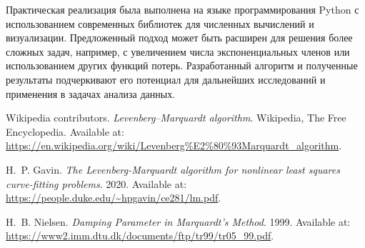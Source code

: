 Практическая реализация была выполнена на языке программирования Python с использованием современных библиотек для численных вычислений и визуализации. Предложенный подход может быть расширен для решения более сложных задач, например, с увеличением числа экспоненциальных членов или использованием других функций потерь. Разработанный алгоритм и полученные результаты подчеркивают его потенциал для дальнейших исследований и применения в задачах анализа данных.

\newpage

\begin{thebibliography}{99}
	Wikipedia contributors.
	\emph{Levenberg--Marquardt algorithm}.
	Wikipedia, The Free Encyclopedia.
	Available at: \url{https://en.wikipedia.org/wiki/Levenberg%E2%80%93Marquardt_algorithm}.

	H.~P. Gavin.
	\emph{The Levenberg-Marquardt algorithm for nonlinear least squares curve-fitting problems}.
	2020.
	Available at: \url{https://people.duke.edu/~hpgavin/ce281/lm.pdf}.

	H.~B. Nielsen.
	\emph{Damping Parameter in Marquardt's Method}.
	1999.
	Available at: \url{https://www2.imm.dtu.dk/documents/ftp/tr99/tr05_99.pdf}.
\end{thebibliography}

